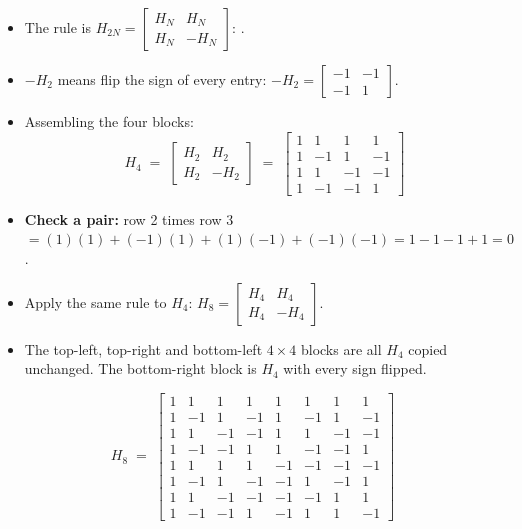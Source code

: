 \begin{itemize}
  \item The rule is \; $H_{2N} = \begin{bmatrix} H_N & H_N \\ H_N & -H_N \end{bmatrix}$:
        .
  \item $-H_2$ means flip the sign of every entry:
        $-H_2 = \begin{bmatrix} -1 & -1 \\ -1 & 1 \end{bmatrix}$.
  \item Assembling the four blocks:
        \[ H_4 \;=\; \begin{bmatrix} H_2 & H_2 \\ H_2 & -H_2 \end{bmatrix}
           \;=\;
           \begin{bmatrix}
             1 &  1 &  1 &  1 \\
             1 & -1 &  1 & -1 \\
             1 &  1 & -1 & -1 \\
             1 & -1 & -1 &  1
           \end{bmatrix} \]
  \item \textbf{Check a pair:} row 2 times row 3
        $= (1)(1) + (-1)(1) + (1)(-1) + (-1)(-1) = 1 - 1 - 1 + 1 = 0$. \checkmark
\end{itemize}

\begin{itemize}
  \item Apply the same rule to $H_4$:
        \; $H_8 = \begin{bmatrix} H_4 & H_4 \\ H_4 & -H_4 \end{bmatrix}$.
  \item The top-left, top-right and bottom-left $4\times4$ blocks are all $H_4$ copied
        unchanged. The bottom-right block is $H_4$ with every sign flipped.
\end{itemize}
\[ H_8 \;=\;
\begin{bmatrix}
 1 &  1 &  1 &  1 &  1 &  1 &  1 &  1 \\
 1 & -1 &  1 & -1 &  1 & -1 &  1 & -1 \\
 1 &  1 & -1 & -1 &  1 &  1 & -1 & -1 \\
 1 & -1 & -1 &  1 &  1 & -1 & -1 &  1 \\
 1 &  1 &  1 &  1 & -1 & -1 & -1 & -1 \\
 1 & -1 &  1 & -1 & -1 &  1 & -1 &  1 \\
 1 &  1 & -1 & -1 & -1 & -1 &  1 &  1 \\
 1 & -1 & -1 &  1 & -1 &  1 &  1 & -1
\end{bmatrix} \]

